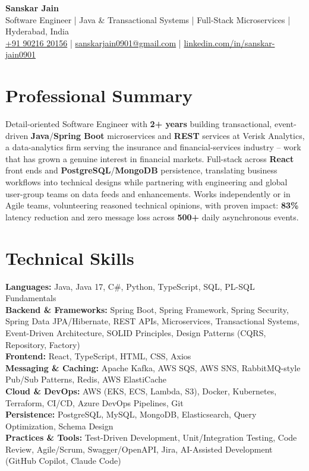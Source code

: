 \documentclass[a4paper,10pt]{article}
\begin{document}
\begin{center}
    {\LARGE \textbf{Sanskar Jain}} \\
    \vspace{2pt}
    Software Engineer \;|\; Java \& Transactional Systems \;|\; Full-Stack Microservices \;|\; Hyderabad, India \\
    \href{tel:+919021620156}{+91 90216 20156} \;|\;
    \href{mailto:sanskarjain0901@gmail.com}{sanskarjain0901@gmail.com} \;|\;
    \href{https://www.linkedin.com/in/sanskar-jain0901/}{linkedin.com/in/sanskar-jain0901}
\end{center}

\section*{Professional Summary}
Detail-oriented Software Engineer with \textbf{2+ years} building transactional, event-driven \textbf{Java}/\textbf{Spring Boot} microservices and \textbf{REST} services at Verisk Analytics, a data-analytics firm serving the insurance and financial-services industry -- work that has grown a genuine interest in financial markets.
Full-stack across \textbf{React} front ends and \textbf{PostgreSQL}/\textbf{MongoDB} persistence, translating business workflows into technical designs while partnering with engineering and global user-group teams on data feeds and enhancements.
Works independently or in Agile teams, volunteering reasoned technical opinions, with proven impact: \textbf{83\%} latency reduction and zero message loss across \textbf{500+} daily asynchronous events.

\section*{Technical Skills}
\begin{sloppypar}
\noindent
\textbf{Languages:} Java, Java 17, C\#, Python, TypeScript, SQL, PL-SQL Fundamentals \\
\textbf{Backend \& Frameworks:} Spring Boot, Spring Framework, Spring Security, Spring Data JPA/Hibernate, REST APIs, Microservices, Transactional Systems, Event-Driven Architecture, SOLID Principles, Design Patterns (CQRS, Repository, Factory) \\
\textbf{Frontend:} React, TypeScript, HTML, CSS, Axios \\
\textbf{Messaging \& Caching:} Apache Kafka, AWS SQS, AWS SNS, RabbitMQ-style Pub/Sub Patterns, Redis, AWS ElastiCache \\
\textbf{Cloud \& DevOps:} AWS (EKS, ECS, Lambda, S3), Docker, Kubernetes, Terraform, CI/CD, Azure DevOps Pipelines, Git \\
\textbf{Persistence:} PostgreSQL, MySQL, MongoDB, Elasticsearch, Query Optimization, Schema Design \\
\textbf{Practices \& Tools:} Test-Driven Development, Unit/Integration Testing, Code Review, Agile/Scrum, Swagger/OpenAPI, Jira, AI-Assisted Development (GitHub Copilot, Claude Code)
\end{sloppypar}
\end{document}
